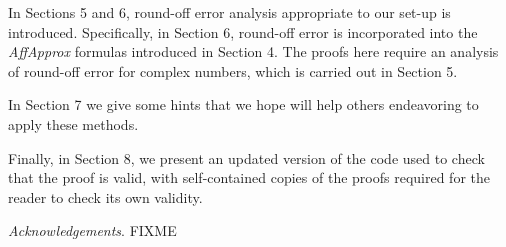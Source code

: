 In Sections 5 and 6, round-off error analysis appropriate to our 
set-up is introduced.  Specifically, in Section 6, round-off error is 
incorporated 
into the {\it AffApprox} formulas introduced in Section 4.  The proofs here 
require an analysis of round-off error for complex numbers, which is carried 
out in Section 5.

In Section 7 we give some hints that we hope will help
others endeavoring to apply these methods.

Finally, in Section 8, we present an updated version of
the code used to check that the proof is valid,
with self-contained copies of the proofs required for the reader
to check its own validity.

{\it Acknowledgements}.
FIXME
